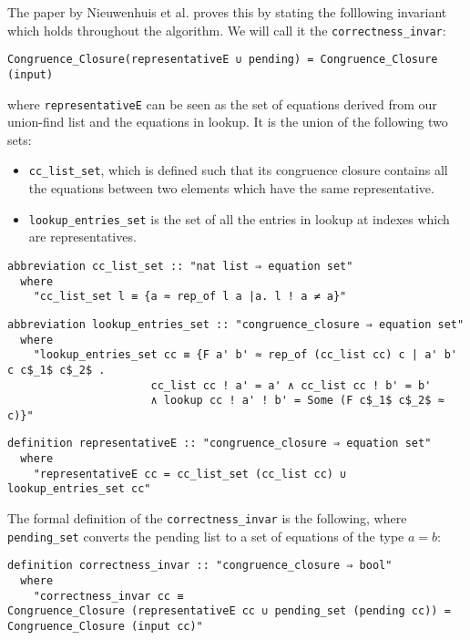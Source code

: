The paper by Nieuwenhuis et al. \cite{Nieuwenhuis} proves this by stating the folllowing invariant which holds throughout the algorithm. We will call it the \lstinline|correctness_invar|:

\begin{lstlisting}
Congruence_Closure(representativeE ∪ pending) = Congruence_Closure (input)
\end{lstlisting}

where \lstinline{representativeE} can be seen as the set of equations derived from our union-find list and the equations in lookup. It is the union of the following two sets:

\begin{itemize}
    \item\lstinline{cc_list_set}, which is defined such that its congruence closure contains all the equations between two elements which have the same representative.
    \item\lstinline{lookup_entries_set} is the set of all the entries in lookup at indexes which are representatives.
\end{itemize}

\begin{lstlisting}
abbreviation cc_list_set :: "nat list ⇒ equation set"
  where
    "cc_list_set l ≡ {a ≈ rep_of l a |a. l ! a ≠ a}"
\end{lstlisting}

\begin{lstlisting}
abbreviation lookup_entries_set :: "congruence_closure ⇒ equation set"
  where
    "lookup_entries_set cc ≡ {F a' b' ≈ rep_of (cc_list cc) c | a' b' c c$_1$ c$_2$ .
                      cc_list cc ! a' = a' ∧ cc_list cc ! b' = b'
                      ∧ lookup cc ! a' ! b' = Some (F c$_1$ c$_2$ ≈ c)}"
\end{lstlisting}

\begin{lstlisting}
definition representativeE :: "congruence_closure ⇒ equation set"
  where
    "representativeE cc = cc_list_set (cc_list cc) ∪ lookup_entries_set cc"
\end{lstlisting}

The formal definition of the \lstinline|correctness_invar| is the following, where \lstinline{pending_set} converts the pending list to a set of equations of the type $a = b$:

\begin{lstlisting}
definition correctness_invar :: "congruence_closure ⇒ bool"
  where
    "correctness_invar cc ≡
Congruence_Closure (representativeE cc ∪ pending_set (pending cc)) = Congruence_Closure (input cc)"
\end{lstlisting}

